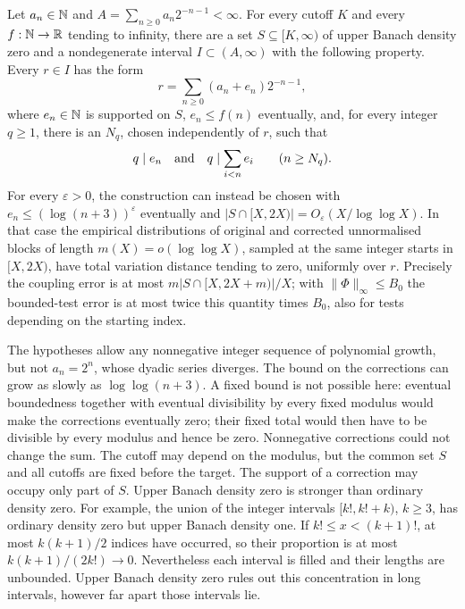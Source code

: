 \documentclass[11pt]{article}
\begin{document}
\begin{theorem}
\label{long251:res:sparse-rationalisation}
Let $a_n\in\mathbb{N}$ and $A=\sum_{n\ge0}a_n2^{-n-1}<\infty$.  For every cutoff
$K$ and every $f:\mathbb{N}\to\mathbb{R}$ tending to infinity, there are a set
$S\subseteq[K,\infty)$ of upper Banach density zero and a nondegenerate
interval $I\subset(A,\infty)$ with the following property.  Every $r\in I$
has the form
\[
 r=\sum_{n\ge0}(a_n+e_n)2^{-n-1},
\]
where $e_n\in\mathbb{N}$ is supported on $S$, $e_n\le f(n)$ eventually, and, for
every integer $q\ge1$, there is an $N_q$, chosen independently of $r$, such that
\[
 q\mid e_n\quad\hbox{and}\quad q\mid\sum_{i<n}e_i
 \qquad(n\ge N_q).
\]
For every $\varepsilon>0$, the construction can instead be chosen with
$e_n\le(\log(n+3))^\varepsilon$ eventually and
$|S\cap[X,2X)|=O_\varepsilon(X/\log\log X)$.  In that case the empirical
distributions of original and corrected unnormalised blocks of length
$m(X)=o(\log\log X)$, sampled at the same integer starts in $[X,2X)$,
have total variation distance tending to zero, uniformly over $r$.
Precisely the coupling error is at most $m|S\cap[X,2X+m)|/X$; with
$\|\Phi\|_\infty\le B_0$ the bounded-test error is at most twice this
quantity times $B_0$, also for tests depending on the starting index.
\end{theorem}

The hypotheses allow any nonnegative integer sequence of polynomial
growth, but not $a_n=2^n$, whose dyadic series diverges.  The bound on the
corrections can grow as slowly as $\log\log(n+3)$.  A fixed bound is not
possible here: eventual boundedness together with eventual divisibility
by every fixed modulus would make the corrections eventually zero; their
fixed total would then have to be divisible by every modulus and hence be
zero.  Nonnegative corrections could not change the sum.
The cutoff may depend on the modulus, but the common set $S$ and all
cutoffs are fixed before the target.  The support of a correction may
occupy only part of $S$.
Upper Banach density zero is stronger than ordinary density zero.  For example, the union of the integer intervals
$[k!,k!+k)$, $k\ge3$, has ordinary density zero but upper Banach density
one.  If $k!\le x<(k+1)!$, at most $k(k+1)/2$ indices have occurred,
so their proportion is at most $k(k+1)/(2k!)\to0$.  Nevertheless each
interval is filled and their lengths are unbounded.  Upper Banach density zero rules out this concentration in long intervals,
however far apart those intervals lie.
\end{document}
